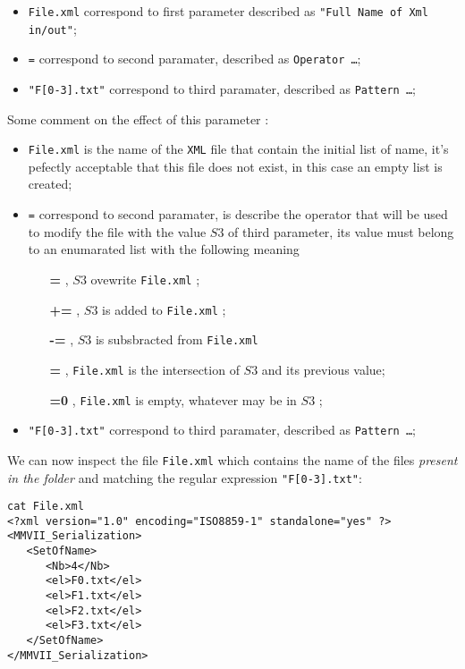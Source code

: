 \documentclass[a4paper]{book}
\begin{document}
{\begin{itemize}
   \item  {\tt File.xml} correspond to first parameter described as {\tt "Full Name of Xml in/out"};
   \item  {\tt =} correspond to second paramater, described as {\tt  Operator \dots};
   \item  {\tt "F[0-3].txt"} correspond to third paramater, described as {\tt Pattern \dots};
\end{itemize}

Some comment on the effect of this parameter :
\begin{itemize}
   \item  {\tt File.xml} is the name of the {\tt XML} file  that contain the initial list of name, 
          it's pefectly acceptable that this file does not exist, in this case an empty list
          is created;

   \item  {\tt =} correspond to second paramater, is describe the operator that will be used to
          modify the file with the value $S3$ of third parameter,  its value must belong to an enumarated list with the following
          meaning
\begin{enumerate}
   \item[{\bf =}]  , $S3$ ovewrite    {\tt File.xml} ;
   \item[{\bf +=}] ,  $S3$ is added to {\tt File.xml} ;
   \item[{\bf -=}] , $S3$ is subsbracted from  {\tt File.xml}
   \item[{\bf *=}] , {\tt File.xml} is the intersection of $S3$ and its previous value;
   \item[{\bf =0}] , {\tt File.xml} is empty, whatever may be in  $S3$ ;
\end{enumerate}

   \item  {\tt "F[0-3].txt"} correspond to third paramater, described as {\tt Pattern \dots};
\end{itemize}


We can now inspect the file {\tt File.xml} which contains the name of the files
\emph{present in the folder} and matching the regular expression  {\tt "F[0-3].txt"}:

\begin{verbatim}
cat File.xml
<?xml version="1.0" encoding="ISO8859-1" standalone="yes" ?>
<MMVII_Serialization>
   <SetOfName>
      <Nb>4</Nb>
      <el>F0.txt</el>
      <el>F1.txt</el>
      <el>F2.txt</el>
      <el>F3.txt</el>
   </SetOfName>
</MMVII_Serialization>
\end{verbatim}

}
\end{document}
